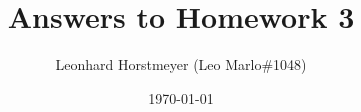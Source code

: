\documentclass[a4paper,10pt]{article}
\title{Answers to Homework 3}
\author{Leonhard Horstmeyer (Leo Marlo\#1048)}
\date{\today}
\begin{document}
\maketitle

\begin{abstract}

\end{abstract}

\section{}
\end{document}
